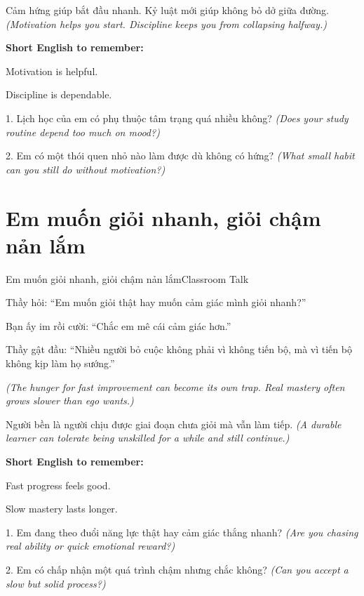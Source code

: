 \begin{baihoc}
Cảm hứng giúp bắt đầu nhanh. Kỷ luật mới giúp không bỏ dở giữa đường.
\textit{(Motivation helps you start. Discipline keeps you from collapsing halfway.)}
\end{baihoc}

\begin{ghinhoanh}
\textbf{Short English to remember:}

Motivation is helpful.

Discipline is dependable.
\end{ghinhoanh}

\begin{tuhocnhanh}
1. Lịch học của em có phụ thuộc tâm trạng quá nhiều không? \textit{(Does your study routine depend too much on mood?)}

2. Em có một thói quen nhỏ nào làm được dù không có hứng? \textit{(What small habit can you still do without motivation?)}
\end{tuhocnhanh}
\ngancach

\section{Em muốn giỏi nhanh, giỏi chậm nản lắm}
\begin{truyen}{Em muốn giỏi nhanh, giỏi chậm nản lắm}{Classroom Talk}

Thầy hỏi: ``Em muốn giỏi thật hay muốn cảm giác mình giỏi nhanh?''

Bạn ấy im rồi cười: ``Chắc em mê cái cảm giác hơn.''

Thầy gật đầu: ``Nhiều người bỏ cuộc không phải vì không tiến bộ, mà vì tiến bộ không kịp làm họ sướng.''

\textit{(The hunger for fast improvement can become its own trap. Real mastery often grows slower than ego wants.)}
\end{truyen}

\begin{baihoc}
Người bền là người chịu được giai đoạn chưa giỏi mà vẫn làm tiếp.
\textit{(A durable learner can tolerate being unskilled for a while and still continue.)}
\end{baihoc}

\begin{ghinhoanh}
\textbf{Short English to remember:}

Fast progress feels good.

Slow mastery lasts longer.
\end{ghinhoanh}

\begin{tuhocnhanh}
1. Em đang theo đuổi năng lực thật hay cảm giác thắng nhanh? \textit{(Are you chasing real ability or quick emotional reward?)}

2. Em có chấp nhận một quá trình chậm nhưng chắc không? \textit{(Can you accept a slow but solid process?)}
\end{tuhocnhanh}
\ngancach